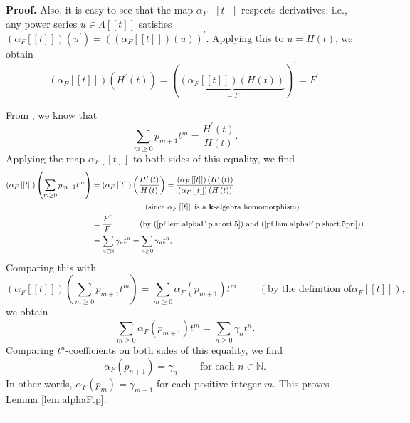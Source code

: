 \documentclass[numbers=enddot,12pt,final,onecolumn,notitlepage]{scrartcl}%
\theoremstyle{definition}
\newenvironment{proof}[1][Proof]{\noindent\textbf{#1.} }{\ \rule{0.5em}{0.5em}}
\let\sumnonlimits\sum
\renewcommand{\sum}{\sumnonlimits\limits}
\newenvironment{vershort}{}{}
\begin{document}
\begin{vershort}
\begin{proof}
Also, it is easy to see that the map $\alpha_{F}\left[  \left[  t\right]
\right]  $ respects derivatives: i.e., any power series $u\in\Lambda\left[
\left[  t\right]  \right]  $ satisfies $\left(  \alpha_{F}\left[  \left[
t\right]  \right]  \right)  \left(  u^{\prime}\right)  =\left(  \left(
\alpha_{F}\left[  \left[  t\right]  \right]  \right)  \left(  u\right)
\right)  ^{\prime}$. Applying this to $u=H\left(  t\right)  $, we obtain%
\begin{equation}
\left(  \alpha_{F}\left[  \left[  t\right]  \right]  \right)  \left(
H^{\prime}\left(  t\right)  \right)  =\left(  \underbrace{\left(  \alpha
_{F}\left[  \left[  t\right]  \right]  \right)  \left(  H\left(  t\right)
\right)  }_{=F}\right)  ^{\prime}=F^{\prime}.
\label{pf.lem.alphaF.p.short.5pri}%
\end{equation}


From \cite[Exercise 2.5.21]{GriRei}, we know that%
\begin{equation}
\sum_{m\geq0}p_{m+1}t^{m}=\dfrac{H^{\prime}\left(  t\right)  }{H\left(
t\right)  }. \label{pf.lem.alphaF.p.short.pHH}%
\end{equation}
Applying the map $\alpha_{F}\left[  \left[  t\right]  \right]  $ to both sides
of this equality, we find%
\begin{align*}
\left(  \alpha_{F}\left[  \left[  t\right]  \right]  \right)  \left(
\sum_{m\geq0}p_{m+1}t^{m}\right)   &  =\left(  \alpha_{F}\left[  \left[
t\right]  \right]  \right)  \left(  \dfrac{H^{\prime}\left(  t\right)
}{H\left(  t\right)  }\right)  =\dfrac{\left(  \alpha_{F}\left[  \left[
t\right]  \right]  \right)  \left(  H^{\prime}\left(  t\right)  \right)
}{\left(  \alpha_{F}\left[  \left[  t\right]  \right]  \right)  \left(
H\left(  t\right)  \right)  }\\
&  \ \ \ \ \ \ \ \ \ \ \ \ \ \ \ \ \ \ \ \ \left(  \text{since }\alpha
_{F}\left[  \left[  t\right]  \right]  \text{ is a }\mathbf{k}\text{-algebra
homomorphism}\right) \\
&  =\dfrac{F^{\prime}}{F}\ \ \ \ \ \ \ \ \ \ \left(  \text{by
(\ref{pf.lem.alphaF.p.short.5}) and (\ref{pf.lem.alphaF.p.short.5pri})}\right)
\\
&  =\sum_{n\in\mathbb{N}}\gamma_{n}t^{n}=\sum_{n\geq0}\gamma_{n}t^{n}.
\end{align*}
Comparing this with%
\[
\left(  \alpha_{F}\left[  \left[  t\right]  \right]  \right)  \left(
\sum_{m\geq0}p_{m+1}t^{m}\right)  =\sum_{m\geq0}\alpha_{F}\left(
p_{m+1}\right)  t^{m}\ \ \ \ \ \ \ \ \ \ \left(  \text{by the definition of
}\alpha_{F}\left[  \left[  t\right]  \right]  \right)  ,
\]
we obtain
\[
\sum_{m\geq0}\alpha_{F}\left(  p_{m+1}\right)  t^{m}=\sum_{n\geq0}\gamma
_{n}t^{n}.
\]
Comparing $t^{n}$-coefficients on both sides of this equality, we find%
\[
\alpha_{F}\left(  p_{n+1}\right)  =\gamma_{n}\ \ \ \ \ \ \ \ \ \ \text{for
each }n\in\mathbb{N}.
\]
In other words, $\alpha_{F}\left(  p_{m}\right)  =\gamma_{m-1}$ for each
positive integer $m$. This proves Lemma \ref{lem.alphaF.p}.
\end{proof}
\end{vershort}
\end{document}
